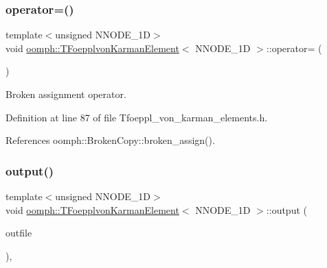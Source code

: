 \subsubsection{\texorpdfstring{operator=()}{operator=()}}
{\footnotesize\ttfamily template$<$unsigned N\+N\+O\+D\+E\+\_\+1D$>$ \\
void \hyperlink{classoomph_1_1TFoepplvonKarmanElement}{oomph\+::\+T\+Foepplvon\+Karman\+Element}$<$ N\+N\+O\+D\+E\+\_\+1D $>$\+::operator= (\begin{DoxyParamCaption}\item[{const \hyperlink{classoomph_1_1TFoepplvonKarmanElement}{T\+Foepplvon\+Karman\+Element}$<$ N\+N\+O\+D\+E\+\_\+1D $>$ \&}]{ }\end{DoxyParamCaption})\hspace{0.3cm}{\ttfamily [inline]}}



Broken assignment operator. 



Definition at line 87 of file Tfoeppl\+\_\+von\+\_\+karman\+\_\+elements.\+h.



References oomph\+::\+Broken\+Copy\+::broken\+\_\+assign().

\mbox{\label{classoomph_1_1TFoepplvonKarmanElement_abc6698f8275d8fc4e526b2d7c7fef6de}} 
\subsubsection{\texorpdfstring{output()}{output()}\hspace{0.1cm}{\footnotesize\ttfamily [1/4]}}
{\footnotesize\ttfamily template$<$unsigned N\+N\+O\+D\+E\+\_\+1D$>$ \\
void \hyperlink{classoomph_1_1TFoepplvonKarmanElement}{oomph\+::\+T\+Foepplvon\+Karman\+Element}$<$ N\+N\+O\+D\+E\+\_\+1D $>$\+::output (\begin{DoxyParamCaption}\item[{std\+::ostream \&}]{outfile }\end{DoxyParamCaption})\hspace{0.3cm}{\ttfamily [inline]}, {\ttfamily [virtual]}}



